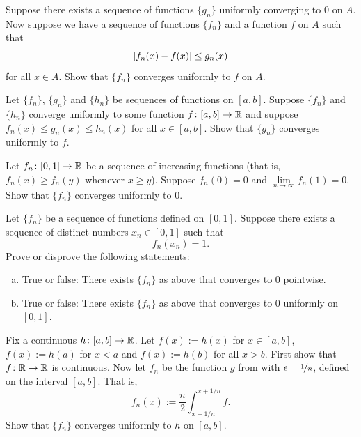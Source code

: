 \begin{exercise}
Suppose there exists a sequence of functions $\{ g_n \}$ uniformly
converging to $0$ on $A$.  Now suppose we have a sequence of functions
$\{ f_n \}$ and a function $f$ on $A$ such that
\begin{equation*}
\left\lvert {f_n(x) - f(x)} \right\rvert \leq g_n(x) 
\end{equation*}
for all $x \in A$.  Show that $\{ f_n \}$ converges uniformly to $f$ on $A$.
\end{exercise}

\begin{exercise}
Let $\{ f_n \}$, $\{ g_n \}$ and $\{ h_n \}$ be sequences of functions on
$[a,b]$.  Suppose $\{ f_n \}$ and $\{ h_n \}$ converge uniformly to some function
$f \colon [a,b] \to {\mathbb{R}}$ and suppose $f_n(x) \leq g_n(x) \leq h_n(x)$
for all $x \in [a,b]$.  Show that $\{ g_n \}$ converges uniformly to $f$.
\end{exercise}

\begin{exercise}
Let $f_n \colon [0,1] \to {\mathbb{R}}$ be a sequence of increasing functions (that
is, $f_n(x) \geq f_n(y)$ whenever $x \geq y$).  Suppose $f_n(0) = 0$
and $\lim\limits_{n \to \infty} f_n(1) = 0$.  Show that
$\{ f_n \}$
converges uniformly to $0$.
\end{exercise}

\begin{exercise}
Let $\{f_n\}$ be a sequence of functions defined on $[0,1]$.
Suppose there exists a sequence of distinct numbers $x_n \in [0,1]$ such that
\begin{equation*}
f_n(x_n) = 1 .
\end{equation*}
Prove or disprove the following statements:
\begin{enumerate}[a)]
\item
True or false: There exists $\{ f_n \}$ as above that converges to $0$
pointwise.
\item
True or false: There exists $\{ f_n \}$ as above that converges to $0$
uniformly on $[0,1]$.
\end{enumerate}
\end{exercise}

\begin{exercise}
Fix a continuous $h \colon [a,b] \to {\mathbb{R}}$.
Let $f(x) := h(x)$ for $x \in [a,b]$,
$f(x) := h(a)$ for $x < a$ and $f(x) := h(b)$ for all $x > b$.  First show
that $f \colon {\mathbb{R}} \to {\mathbb{R}}$ is continuous.
Now let $f_n$ be
the function $g$ from  with
$\epsilon = \nicefrac{1}{n}$, defined on the interval $[a,b]$.  That is,
\begin{equation*}
f_n(x) := \frac{n}{2} \int_{x-1/n}^{x+1/n} f .
\end{equation*}
Show that $\{ f_n \}$ converges uniformly to $h$ on $[a,b]$.
\end{exercise}


